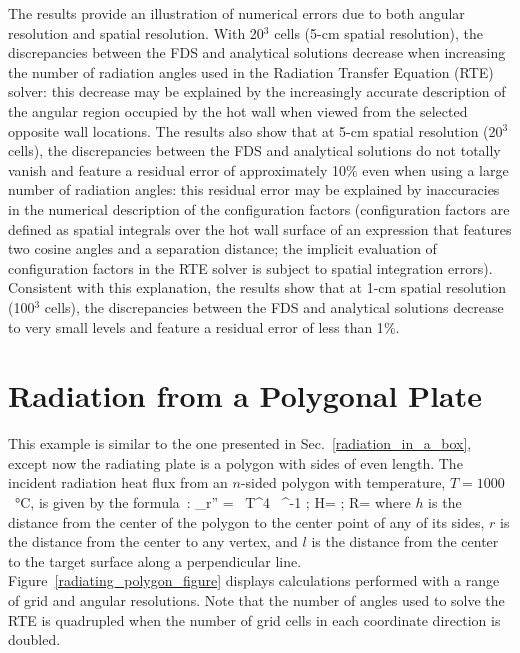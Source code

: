 \documentclass[11pt]{book}
\begin{document}
The results provide an illustration of numerical errors due to both angular resolution and spatial resolution. With 20$^3$ cells (5-cm spatial resolution), the discrepancies between the FDS and analytical solutions decrease when increasing the number of radiation angles used in the Radiation Transfer Equation (RTE) solver: this decrease may be explained by the increasingly accurate description of the angular region occupied by the hot wall when viewed from the selected opposite wall locations. The results also show that at 5-cm spatial resolution (20$^3$ cells), the discrepancies between the FDS and analytical solutions do not totally vanish and feature a residual error of approximately 10$\%$ even when using a large number of radiation angles: this residual error may be explained by inaccuracies in the numerical description of the configuration factors (configuration factors are defined as spatial integrals over the hot wall surface of an expression that features two cosine angles and a separation distance; the implicit evaluation of configuration factors in the RTE solver is subject to spatial integration errors). Consistent with this explanation, the results show that at 1-cm spatial resolution (100$^3$ cells), the discrepancies between the FDS and analytical solutions decrease to very small levels and feature a residual error of less than 1$\%$.

\section{Radiation from a Polygonal Plate}
\label{radiating_polygon}

This example is similar to the one presented in Sec.~\ref{radiation_in_a_box}, except now the radiating plate is a polygon with sides of even length. The incident radiation heat flux from an $n$-sided polygon with temperature, $T=1000$~\unit{\degreeCelsius}, is given by the formula~\cite{Siegel:1}:
\be
   \dq_{\rm r}'' = \sigma \, T^4 \,  \; \tan^{-1}  \quad ; \quad H= \quad ; \quad R=
   \label{plate_view_factor_eq}
\ee
where $h$ is the distance from the center of the polygon to the center point of any of its sides, $r$ is the distance from the center to any vertex, and $l$ is the distance from the center to the target surface along a perpendicular line. Figure~\ref{radiating_polygon_figure} displays calculations performed with a range of grid and angular resolutions. Note that the number of angles used to solve the RTE is quadrupled when the number of grid cells in each coordinate direction is doubled.
\end{document}
